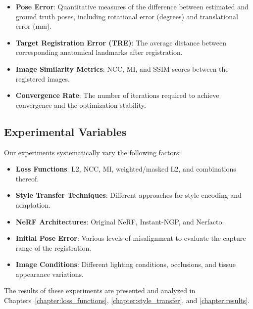 \begin{itemize}
    \item \textbf{Pose Error}: Quantitative measures of the difference between estimated and ground truth poses, including rotational error (degrees) and translational error (mm).
    
    \item \textbf{Target Registration Error (TRE)}: The average distance between corresponding anatomical landmarks after registration.
    
    \item \textbf{Image Similarity Metrics}: NCC, MI, and SSIM scores between the registered images.
    
    \item \textbf{Convergence Rate}: The number of iterations required to achieve convergence and the optimization stability.
\end{itemize}

\subsection{Experimental Variables}

Our experiments systematically vary the following factors:

\begin{itemize}
    \item \textbf{Loss Functions}: L2, NCC, MI, weighted/masked L2, and combinations thereof.
    
    \item \textbf{Style Transfer Techniques}: Different approaches for style encoding and adaptation.
    
    \item \textbf{NeRF Architectures}: Original NeRF, Instant-NGP, and Nerfacto.
    
    \item \textbf{Initial Pose Error}: Various levels of misalignment to evaluate the capture range of the registration.
    
    \item \textbf{Image Conditions}: Different lighting conditions, occlusions, and tissue appearance variations.
\end{itemize}

The results of these experiments are presented and analyzed in Chapters~\ref{chapter:loss_functions}, \ref{chapter:style_transfer}, and \ref{chapter:results}. 